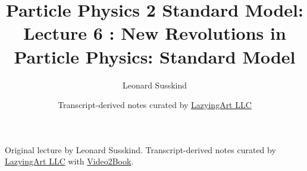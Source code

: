 \documentclass[11pt,oneside]{book}
\begin{document}
\frontmatter
\title{Particle Physics 2 Standard Model: Lecture 6 : New Revolutions in Particle Physics: Standard Model}
\author{Leonard Susskind}
\date{Transcript-derived notes curated by \href{https://lazying.art}{LazyingArt LLC}}
\maketitle
\begin{center}
\small Original lecture by Leonard Susskind. Transcript-derived notes curated by \href{https://lazying.art}{LazyingArt LLC} with \href{https://github.com/lachlanchen/Video2Book}{Video2Book}.
\end{center}
\clearpage
\mainmatter

\end{document}
